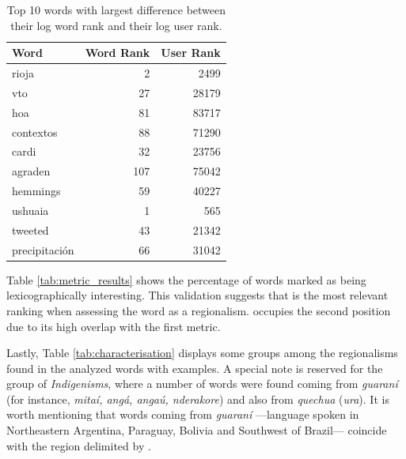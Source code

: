 \begin{table}[h]
    \centering
        
    \begin{tabular}{lrr}
    Word &  Word Rank &  User Rank \\
    \hline
    rioja         &              2 &           2499 \\
    vto           &             27 &          28179 \\
    hoa           &             81 &          83717 \\
    contextos     &             88 &          71290 \\
    cardi         &             32 &          23756 \\
    agraden       &            107 &          75042 \\
    hemmings      &             59 &          40227 \\
    ushuaia       &              1 &            565 \\
    tweeted       &             43 &          21342 \\
    precipitación &             66 &          31042 \\
    \hline
    \end{tabular}

    \caption{Top 10 words with largest difference between their log word rank and their log user rank.}
    \label{tab:table_rank_differences}
\end{table}

Table \ref{tab:metric_results} shows the percentage of words marked as being lexicographically interesting. This validation suggests that \userrank*{} is the most relevant ranking when assessing the word as a regionalism. \mixedrank{} occupies the second position due to its high overlap with the first metric.

Lastly, Table \ref{tab:characterisation} displays some groups among the regionalisms found in the analyzed words with examples. A special note is reserved for the group of \emph{Indigenisms}, where a number of words were found coming from \emph{guaraní} (for instance, \emph{mitaí, angá, angaú, nderakore}) and also from \emph{quechua} (\emph{ura}). It is worth mentioning that words coming from \emph{guaraní} —language spoken in Northeastern Argentina, Paraguay, Bolivia and Southwest of Brazil— coincide with the region delimited by \citet{vidal1964espanol}.


